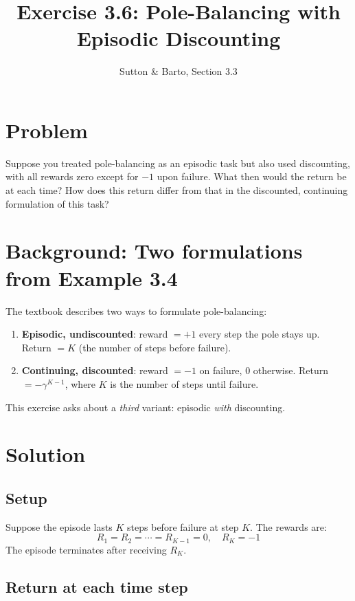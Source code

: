 \documentclass[11pt]{article}
\title{Exercise 3.6: Pole-Balancing with Episodic Discounting}
\author{Sutton \& Barto, Section 3.3}
\date{}
\begin{document}
\maketitle

\section*{Problem}

Suppose you treated pole-balancing as an episodic task but also used
discounting, with all rewards zero except for $-1$ upon failure.
What then would the return be at each time? How does this return differ
from that in the discounted, continuing formulation of this task?

\section*{Background: Two formulations from Example 3.4}

The textbook describes two ways to formulate pole-balancing:

\begin{enumerate}
    \item \textbf{Episodic, undiscounted}: reward $=+1$ every step the pole stays up.
          Return $= K$ (the number of steps before failure).
    \item \textbf{Continuing, discounted}: reward $= -1$ on failure, $0$ otherwise.
          Return $= -\gamma^{K-1}$, where $K$ is the number of steps until failure.
\end{enumerate}

This exercise asks about a \emph{third} variant: episodic \emph{with} discounting.

\section*{Solution}

\subsection*{Setup}

Suppose the episode lasts $K$ steps before failure at step $K$.
The rewards are:
\[
    R_1 = R_2 = \cdots = R_{K-1} = 0, \quad R_K = -1
\]
The episode terminates after receiving $R_K$.

\subsection*{Return at each time step}
\end{document}

